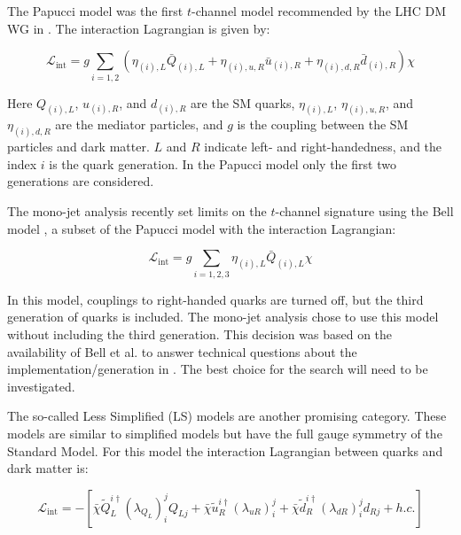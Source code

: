 The Papucci model \cite{Papucci:2014iwa} was the first $t$-channel model recommended by the LHC DM WG in \cite{Abercrombie:2015wmb}. The interaction Lagrangian is given by:

\begin{equation}
\mathcal{L}_\text{int} = g \sum_{i=1,2} \left( \eta_{(i),L} \bar{Q}_{(i),L} + \eta_{(i),u,R} \bar{u}_{(i),R} + \eta_{(i),d,R} \bar{d}_{(i),R} \right) \chi
\end{equation}

\noindent Here $Q_{(i),L}$, $u_{(i),R}$, and $d_{(i),R}$ are the SM quarks, $\eta_{(i),L}$, $\eta_{(i),u,R}$, and $\eta_{(i),d,R}$ are the mediator particles, and $g$ is the coupling between the SM particles and dark matter. $L$ and $R$ indicate left- and right-handedness, and the index $i$ is the quark generation. In the Papucci model only the first two generations are considered. 

The mono-jet analysis recently set limits on the $t$-channel signature using the Bell model \cite{Bell:2012rg}, a subset of the Papucci model with the interaction Lagrangian:

\begin{equation}
\mathcal{L}_\text{int} = g \sum_{i=1,2,3} \eta_{(i),L} \bar{Q}_{(i),L} \chi
\end{equation}

\noindent In this model, couplings to right-handed quarks are turned off, but the third generation of quarks is included. The mono-jet analysis chose to use this model without including the third generation. This decision was based on the availability of Bell et al.\xspace to answer technical questions about the implementation/generation in \madgraph. The best choice for the \monoZ search will need to be investigated.

The so-called Less Simplified (LS) models \cite{Ko:2016zxg} are another promising category. These models are similar to simplified models but have the full gauge symmetry of the Standard Model. For this model the interaction Lagrangian between quarks and dark matter is:

\begin{equation}
\mathcal{L}_\text{int} = - \left[ \bar{\chi} \tilde{Q}_L^{i\dagger}(\lambda_{Q_L})_i^j Q_{Lj} + \bar{\chi} \tilde{u}_R^{i\dagger} (\lambda_{uR})_i^j + \bar{\chi} \tilde{d}_R^{i\dagger} (\lambda_{dR})_i^j d_{Rj} + h.c. \right]
\end{equation}


